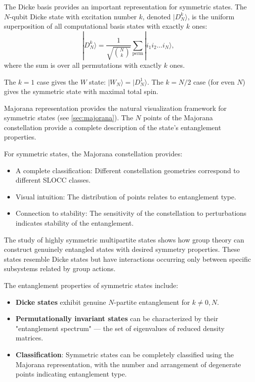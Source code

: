 \documentclass[12pt,a4paper]{article}
\begin{document}
The Dicke basis provides an important representation for symmetric states. The $N$-qubit Dicke state with excitation number $k$, denoted $|D_N^k\rangle$, is the uniform superposition of all computational basis states with exactly $k$ ones:
\label{sec:dicke}
\begin{equation}
	|D_N^k\rangle = \frac{1}{\sqrt{\binom{N}{k}}} \sum_{\text{perm}} |i_1 i_2 \ldots i_N\rangle,
\end{equation}
where the sum is over all permutations with exactly $k$ ones.

The $k=1$ case gives the $W$ state: $|W_N\rangle = |D_N^1\rangle$. The $k=N/2$ case (for even $N$) gives the symmetric state with maximal total spin.

Majorana representation provides the natural visualization framework for symmetric states (see \cref{sec:majorana}). The $N$ points of the Majorana constellation provide a complete description of the state's entanglement properties.

For symmetric states, the Majorana constellation provides:
\begin{itemize}
	\item A complete classification: Different constellation geometries correspond to different SLOCC classes.
	\item Visual intuition: The distribution of points relates to entanglement type.
	\item Connection to stability: The sensitivity of the constellation to perturbations indicates stability of the entanglement.
\end{itemize}

The study of highly symmetric multipartite states \cite{Burchardt2021} shows how group theory can construct genuinely entangled states with desired symmetry properties. These states resemble Dicke states but have interactions occurring only between specific subsystems related by group actions.

The entanglement properties of symmetric states include:
\begin{itemize}
	\item \textbf{Dicke states} exhibit genuine $N$-partite entanglement for $k \neq 0, N$.
	\item \textbf{Permutationally invariant states} can be characterized by their "entanglement spectrum" --- the set of eigenvalues of reduced density matrices.
	\item \textbf{Classification}: Symmetric states can be completely classified using the Majorana representation, with the number and arrangement of degenerate points indicating entanglement type.
\end{itemize}
\end{document}
